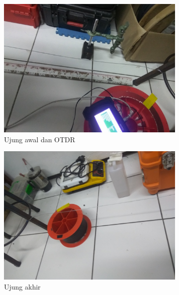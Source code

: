 \documentclass[12pt]{article}
\begin{document}
	\begin{figure}[!ht]
		\centering
		\captionsetup{justification=centering}
		\begin{subfigure}[b]{0.3\textwidth}
			\includegraphics[width=\textwidth]{images/Bab_4/Bab_4_5a}	
			\caption{\small{Ujung awal dan OTDR}}		
		\end{subfigure}
		\begin{subfigure}[b]{0.3\textwidth}
			\includegraphics[width=\linewidth]{images/Bab_4/Bab_4_5b}
			\caption{\small{Ujung akhir}}			
		\end{subfigure}
		\begin{subfigure}[b]{0.4\textwidth}

\end{subfigure}
\end{figure}
\end{document}
